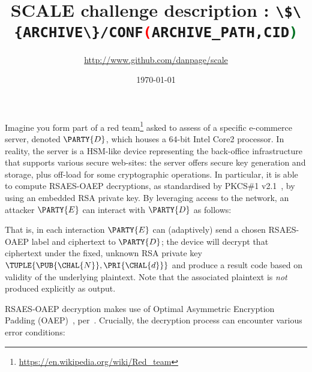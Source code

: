 \documentclass[crop={false},multi={true},tikz={true}]{standalone}
\begin{document}

\ifstandalone
\author{\url{http://www.github.com/danpage/scale}}
\title{\Large SCALE challenge description : \lstinline[language={bash}]|\$\{ARCHIVE\}/CONF(ARCHIVE_PATH,CID)|}
\date{\today}

\maketitle
\fi



Imagine you form part of a red team\footnote{
\url{https://en.wikipedia.org/wiki/Red_team}
} asked to assess of a specific e-commerce server, denoted $\PARTY{D}$, 
which houses a $64$-bit Intel Core2 processor.  
In reality, the server is a HSM-like device representing the back-office 
infrastructure that supports various secure web-sites: the server offers
secure key generation and storage, plus off-load for some cryptographic 
operations.  In particular, it is able to compute RSAES-OAEP decryptions, 
as standardised by PKCS\#1 v2.1~\cite{SCALE:RFC:3447}, by using an 
embedded RSA private key.
By leveraging access to the network, 
an attacker $\PARTY{E}$ can interact with $\PARTY{D}$ as follows:

\begin{center}

\end{center}

\noindent
That is, in each interaction $\PARTY{E}$ can (adaptively) send 
a chosen RSAES-OAEP label and ciphertext
to $\PARTY{D}$; the device will
decrypt that ciphertext under the fixed, unknown RSA private key $\TUPLE{ \PUB{\CHAL{N}}, \PRI{\CHAL{d}} }$ 
and produce 
a result code based on validity of the underlying  plaintext.
Note that the associated  plaintext is {\em not} produced explicitly as
output.

RSAES-OAEP decryption makes use of Optimal Asymmetric Encryption Padding 
(OAEP)~\cite{SCALE:BelRog:94}, per~\cite[Section 7.1]{SCALE:RFC:3447}.  
Crucially, the decryption process can encounter various error conditions:
\end{document}
